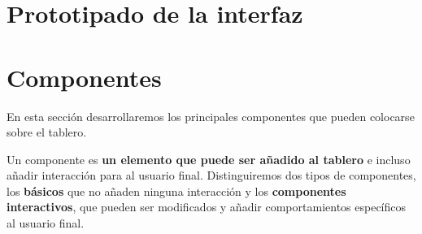 \section{Prototipado de la interfaz}

\section{Componentes}


En esta sección desarrollaremos los principales componentes que pueden colocarse sobre el tablero. 

Un componente es \textbf{un elemento que puede ser añadido al tablero} e incluso añadir interacción para al usuario final. Distinguiremos dos tipos de componentes, los \textbf{básicos} que no añaden ninguna interacción y los \textbf{componentes interactivos}, que pueden ser modificados y añadir comportamientos específicos al usuario final.

